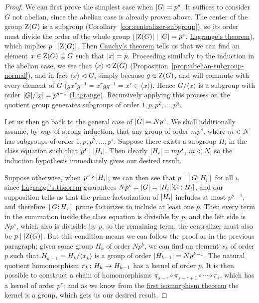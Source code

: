 \begin{proof}
    We can first prove the simplest case when \(\abs{G} = p^s\).
    It suffices to consider \(G\) not abelian,
    since the abelian case is already proven above.
    The center of the group \(\operatorname{Z}(G)\)
    is a subgroup (Corollary~\ref{cor:centralizer-subgroup}),
    so its order must divide the order of the whole group
    (\(\abs{\operatorname{Z}(G)} \mid \abs{G} = p^s\),
    \hyperref[thm:lagrange]{Lagrange's theorem}),
    which implies \(p \mid \abs{\operatorname{Z}(G)}\).
    Then \hyperref[thm:cauchy]{Cauchy's theorem} tells us that
    we can find an element \(x \in \operatorname{Z}(G) \subsetneq G\)
    such that \(\abs{x} = p\).
    Proceeding similarly to the induction in the abelian case,
    we see that \(\langle x \rangle \lhd \operatorname{Z}(G)\)
    (Proposition~\ref{prop:abelian-subgroup-normal}),
    and in fact \(\langle x \rangle \lhd G\),
    simply because \(g \in \operatorname{Z}(G)\),
    and will commute with every element of \(G\)
    (\(gx^r g^{-1} = x^r gg^{-1} = x^r \in \langle x \rangle\)).
    Hence \(G/\langle x \rangle\) is a subgroup
    with order \(\abs{G}/\abs{x} = p^{s-1}\)
    (\hyperref[thm:lagrange]{Lagrange}).
    Recursively applying this process on the quotient group
    generates subgroups of order \(1,p,p^2,\hdots,p^s\).

    Let us then go back to the general case of \(\abs{G} = Np^s\).
    We shall additionally assume, by way of strong induction,
    that any group of order \(mp^s\), where \(m < N\)
    has subgroups of order \(1,p,p^2,\hdots,p^s\).
    Suppose there exists a subgroup \(H_i\) in the class equation
    such that \(p^s \mid \abs{H_i}\).
    Then clearly \(\abs{H_i} = mp^s\), \(m < N\),
    so the induction hypothesis immediately gives our desired result.

    Suppose otherwise, when \(p^s \nmid \abs{H_i}\);
    we can then see that \(p \mid [G:H_i]\) for all \(i\),
    since \hyperref[thm:lagrange]{Lagrange's theorem}
    guarantees \(Np^s = \abs{G} = \abs{H_i}[G:H_i]\),
    and our supposition tells us that the prime factorization of \(\abs{H_i}\)
    includes at most \(p^{s-1}\),
    and therefore \([G:H_i]\) prime factorizes to include at least one \(p\).
    Then every term in the summation inside the class equation
    is divisible by \(p\),
    and the left side is \(Np^s\), which also is divisible by \(p\),
    so the remaining term,
    the centralizer must also be \(p \mid \abs{\operatorname{Z}(G)}\).
    But this condition means we can follow the proof
    as in the previous paragraph;
    given some group \(H_k\) of order \(Np^k\),
    we can find an element \(x_k\) of order \(p\)
    such that \(H_{k-1} = H_k/\langle x_k \rangle\)
    is a group of order \(\abs{H_{k-1}} = Np^{k-1}\).
    The natural quotient homomorphism \(\pi_k\colon H_k\to H_{k-1}\)
    has a kernel of order \(p\).
    It is then possible to construct a chain of homomorphisms
    \(\pi_{s-r}\circ\pi_{s-r+1}\circ\cdots\circ\pi_s\),
    which has a kernel of order \(p^r\);
    and as we know
    from the \hyperref[thm:iso-1-group]{first isomorphism theorem}
    the kernel is a group,
    which gets us our desired result.
\end{proof}
